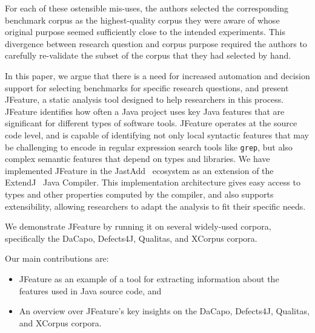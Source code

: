For each of these ostensible mis-uses, the authors selected the corresponding benchmark corpus
as the highest-quality corpus they were aware of whose original purpose
seemed sufficiently close to the intended experiments.  This divergence between research
question and corpus purpose required the authors to carefully re-validate the
subset of the corpus that they had selected by hand.


In this paper, we argue that there is a need for increased automation and decision support
for selecting benchmarks for specific research questions, and present JFeature, a static analysis tool
designed to help researchers in this process.
JFeature identifies how often a Java project uses key Java features that are
significant for different types of software tools.
JFeature operates at the source code level, and is capable of identifying
not only local syntactic features that may be challenging to encode in regular expression search tools
like \texttt{grep}, but also complex semantic features that depend on types and libraries.
We have implemented JFeature
in the JastAdd~\cite{hedin2003jastadd} ecosystem as
an extension of the ExtendJ~\cite{ekman2007jastadd} Java Compiler.
This implementation architecture gives easy access to types and other properties computed by the compiler,
and also supports extensibility,
allowing researchers to adapt the analysis to fit their specific needs.

We demonstrate JFeature by running it on several widely-used corpora, specifically the
DaCapo, Defects4J, Qualitas, and XCorpus corpora.

Our main contributions are:
\begin{itemize}
    \item JFeature as an example of a tool
     for extracting information about the features used in Java source code, and
     \item An overview over JFeature's key insights on the
      DaCapo, Defects4J,  Qualitas, and XCorpus corpora.
\end{itemize}


